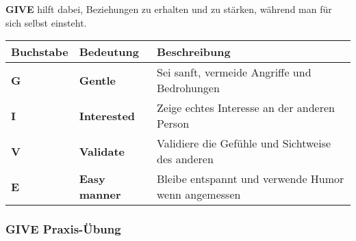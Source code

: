 \begin{ctmmPurpleBox}[title=GIVE Technik]

\textbf{GIVE} hilft dabei, Beziehungen zu erhalten und zu stärken, während man für sich selbst einsteht.

\vspace{0.5em}

\begin{tabular}{|l|l|p{8cm}|}
\hline
\textbf{Buchstabe} & \textbf{Bedeutung} & \textbf{Beschreibung} \\
\hline
\textcolor{ctmmGreen}{\textbf{G}} & \textbf{Gentle} & Sei sanft, vermeide Angriffe und Bedrohungen \\
\hline
\textcolor{ctmmBlue}{\textbf{I}} & \textbf{Interested} & Zeige echtes Interesse an der anderen Person \\
\hline
\textcolor{ctmmOrange}{\textbf{V}} & \textbf{Validate} & Validiere die Gefühle und Sichtweise des anderen \\
\hline
\textcolor{ctmmPurple}{\textbf{E}} & \textbf{Easy manner} & Bleibe entspannt und verwende Humor wenn angemessen \\
\hline
\end{tabular}

\end{ctmmPurpleBox}

\subsubsection{GIVE Praxis-Übung}

